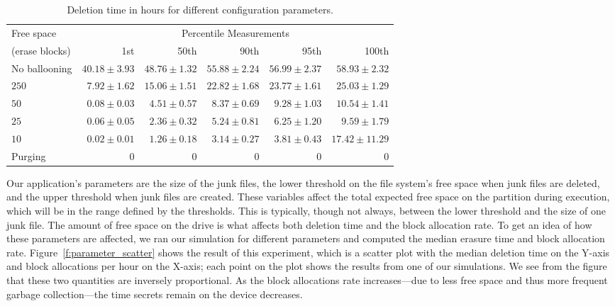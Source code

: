 \documentclass{acmtog}
\begin{document}
\begin{table*}[t]
\centering
\begin{tabular}{lrrrrr}
\hline
Free space   & \multicolumn{5}{c}{Percentile Measurements} \\
(erase  blocks)  & 1st & 50th & 90th & 95th & 100th \\ 
\hline
No ballooning  & $ 40.18 \pm 3.93 $ & $ 48.76 \pm 1.32 $ & $
55.88 \pm 2.24 $ & $ 56.99 \pm 2.37 $ & $ 58.93 \pm 2.32 $ \\


$ 250$ & $ 7.92 \pm 1.62 $ & $ 15.06 \pm 1.51 $ & $ 22.82 \pm 1.68 $ & $
23.77 \pm 1.61 $ & $ 25.03 \pm 1.29 $ \\ 

$ 50$ & $ 0.08 \pm 0.03 $ & $ 4.51 \pm 0.57 $ & $ 8.37 \pm 0.69 $ & $
 9.28 \pm 1.03 $ & $ 10.54 \pm 1.41 $ \\



$ 25$ & $ 0.06 \pm 0.05 $ & $ 2.36 \pm 0.32 $ & $ 5.24 \pm 0.81 $ & $
6.25 \pm 1.20 $ & $ 9.59 \pm 1.79 $ \\ 

$ 10$ & $ 0.02 \pm 0.01 $ & $ 1.26 \pm 0.18 $ & $ 3.14 \pm 0.27 $ & $
3.81 \pm 0.43 $ & $ 17.42 \pm 11.29 $ \\ 
Purging & $0$ & $0$ & $0$ & $0$ & $0$ \\

\hline

\end{tabular}
\caption{\small Deletion time in hours for different configuration parameters.
\label{t:erasures}\normalsize}
\end{table*}

Our application's parameters are the size of the junk files, the lower
threshold on the file system's free space when junk files are deleted, and the
upper threshold when junk files are created. 
These variables affect the total
expected free space on the partition during execution, which will be in the
range defined by the thresholds. This is typically, though not always, between the lower threshold and
the size of one junk file. The amount of free space on the drive is what
affects both deletion time and the block allocation rate. To get an idea of
how these parameters are affected, we ran our simulation for different
parameters and computed the median erasure time and block allocation rate.
Figure~\ref{f:parameter_scatter} shows the result of this experiment, which is
a scatter plot with the median deletion time on the Y-axis and block allocations
per hour on the X-axis; each point on the plot shows the results from one of our
simulations. We see from the figure that these two quantities
are inversely proportional. As the block allocations rate
increases---due to less free space and thus more frequent garbage
collection---the time secrets remain on the device decreases. 
\end{document}
